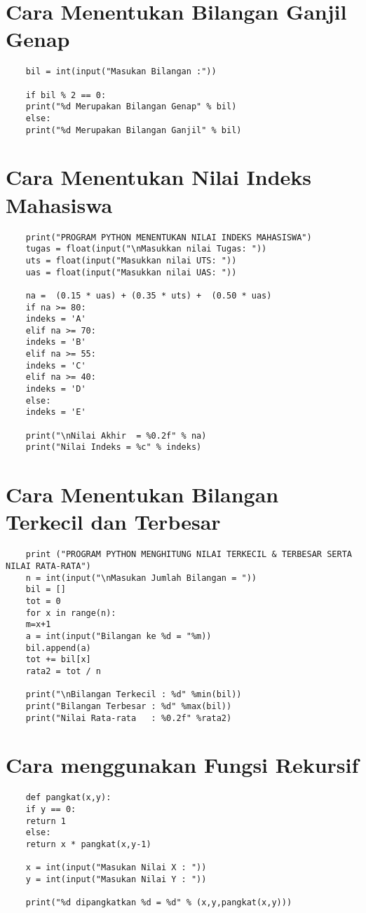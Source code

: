 \documentclass{article}
\begin{document}
\section {Cara Menentukan Bilangan Ganjil Genap}
\begin{lstlisting}
	bil = int(input("Masukan Bilangan :"))
	
	if bil % 2 == 0:
	print("%d Merupakan Bilangan Genap" % bil)
	else:
	print("%d Merupakan Bilangan Ganjil" % bil)
\end{lstlisting}

\section {Cara Menentukan Nilai Indeks Mahasiswa}
\begin{lstlisting}
	print("PROGRAM PYTHON MENENTUKAN NILAI INDEKS MAHASISWA")
	tugas = float(input("\nMasukkan nilai Tugas: "))
	uts = float(input("Masukkan nilai UTS: "))
	uas = float(input("Masukkan nilai UAS: "))
	
	na =  (0.15 * uas) + (0.35 * uts) +  (0.50 * uas)
	if na >= 80:
	indeks = 'A'
	elif na >= 70:
	indeks = 'B'
	elif na >= 55:
	indeks = 'C'
	elif na >= 40:
	indeks = 'D'
	else:
	indeks = 'E'
	
	print("\nNilai Akhir  = %0.2f" % na)
	print("Nilai Indeks = %c" % indeks)
\end{lstlisting}

\section {Cara Menentukan Bilangan Terkecil dan Terbesar}
\begin{lstlisting}
	print ("PROGRAM PYTHON MENGHITUNG NILAI TERKECIL & TERBESAR SERTA NILAI RATA-RATA")
	n = int(input("\nMasukan Jumlah Bilangan = "))
	bil = []
	tot = 0
	for x in range(n):
	m=x+1
	a = int(input("Bilangan ke %d = "%m))
	bil.append(a)
	tot += bil[x]
	rata2 = tot / n
	
	print("\nBilangan Terkecil : %d" %min(bil))
	print("Bilangan Terbesar : %d" %max(bil))
	print("Nilai Rata-rata   : %0.2f" %rata2)
\end{lstlisting}

\section {Cara menggunakan Fungsi Rekursif}
\begin{lstlisting}
	def pangkat(x,y):
	if y == 0:
	return 1
	else:
	return x * pangkat(x,y-1)
	
	x = int(input("Masukan Nilai X : "))
	y = int(input("Masukan Nilai Y : "))
	
	print("%d dipangkatkan %d = %d" % (x,y,pangkat(x,y)))
\end{lstlisting}
\end{document}
